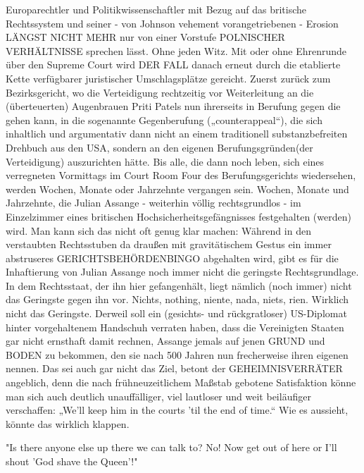 \begin{multicols}{2}
{Europarechtler und Politikwissenschaftler mit Bezug auf das britische
Rechtssystem und seiner - von Johnson vehement vorangetriebenen - Erosion
LÄNGST NICHT MEHR nur von einer Vorstufe POLNISCHER VERHÄLTNISSE sprechen
lässt. Ohne jeden Witz.\textCR
Mit oder ohne Ehrenrunde über den Supreme Court wird DER FALL danach erneut
durch die etablierte Kette verfügbarer juristischer Umschlagsplätze gereicht.
Zuerst zurück zum Bezirksgericht, wo die Verteidigung rechtzeitig vor
Weiterleitung an die (überteuerten) Augenbrauen Priti Patels nun ihrerseits in
Berufung gegen die %
gehen kann, in die sogenannte Gegenberufung („counterappeal“), die sich
inhaltlich und argumentativ dann nicht an einem traditionell substanzbefreiten
Drehbuch aus den USA, sondern an den eigenen Berufungsgründen(der Verteidigung)
auszurichten hätte.\textCR
Bis alle, die dann noch leben, sich eines verregneten Vormittags im Court Room
Four des Berufungsgerichts wiedersehen, werden Wochen, Monate oder Jahrzehnte
vergangen sein. Wochen, Monate und Jahrzehnte, die Julian Assange - weiterhin
völlig rechtsgrundlos - im Einzelzimmer eines britischen
Hochsicherheitsgefängnisses festgehalten (werden) wird. Man kann sich das nicht
oft genug klar machen: Während in den verstaubten Rechtsstuben da draußen mit
gravitätischem Gestus ein immer abstruseres GERICHTSBEHÖRDENBINGO abgehalten
wird, gibt es für die Inhaftierung von Julian Assange noch immer nicht die
geringste Rechtsgrundlage. In dem Rechtsstaat, der ihn hier gefangenhält, liegt
nämlich (noch immer) nicht das Geringste gegen ihn vor. Nichts, nothing,
niente, nada, niets, rien. Wirklich nicht das Geringste.\textCR
Derweil soll ein (gesichts- und rückgratloser) US-Diplomat hinter vorgehaltenem
Handschuh verraten haben, dass die Vereinigten Staaten gar nicht ernsthaft
damit rechnen, Assange jemals auf jenen GRUND und BODEN zu bekommen, den sie
nach 500 Jahren nun frecherweise ihren eigenen nennen. Das sei auch gar nicht
das Ziel, betont der GEHEIMNISVERRÄTER angeblich, denn die nach
frühneuzeitlichem Maßstab gebotene Satisfaktion könne man sich auch deutlich
unauffälliger, viel lautloser und weit beiläufiger verschaffen: „We’ll keep him
in the courts ’til the end of time.“\textCR
Wie es aussieht, könnte das wirklich klappen.}

\epigraph{"Is there anyone else up there we can talk to? No! Now get out of here or I'll shout 'God
 shave the Queen'!"}{}


\end{multicols}
